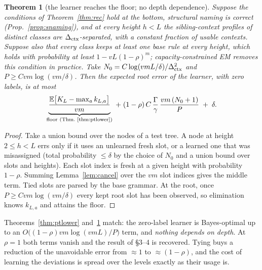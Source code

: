 \documentclass[11pt]{article}
\newtheorem{theorem}{Theorem}
\theoremstyle{definition}
\newcommand{\E}{\mathbb{E}}
\begin{document}
\begin{theorem}[the learner reaches the floor; no depth dependence]\label{thm:ptupper}
Suppose the conditions of Theorem~\ref{thm:rec} hold at the bottom, structural naming is correct
(Prop.~\ref{prop:snaming}), and at every height $h<L$ the sibling-context profiles of distinct
classes are $\Delta_{\rm ctx}$-separated, with a constant fraction of usable contexts. Suppose
also that every class keeps at least one base rule at every height, which holds with probability
at least $1-vL(1-\rho)^m$; capacity-constrained EM removes this condition in practice. Take
$N_0=C\log(vmL/\delta)/\Delta_{\rm ctx}^2$ and $P\ge Cvm\log(vm/\delta)$. Then the expected root
error of the learner, with zero labels, is at most
\[
\underbrace{\frac{\E\big[K_L-\max_ak_{L,a}\big]}{vm}}_{\text{floor (Thm.~\ref{thm:ptlower})}}
\;+\;(1-\rho)\,C\,\frac{\Gamma}{\gamma}\,\frac{vm\,(N_0+1)}{P}\;+\;\delta .
\]
\end{theorem}
\begin{proof}
Take a union bound over the nodes of a test tree. A node at height $2\le h<L$ errs only if it
uses an unlearned fresh slot, or a learned one that was misassigned (total probability $\le\delta$
by the choice of $N_0$ and a union bound over slots and heights). Each slot index is fresh at a
given height with probability $1-\rho$. Summing Lemma~\ref{lem:cancel} over the $vm$ slot
indices gives the middle term. Tied slots are parsed by the base grammar. At the root, once
$P\ge Cvm\log(vm/\delta)$ every kept root slot has been observed, so elimination knows
$k_{L,a}$ and attains the floor.
\end{proof}
\noindent Theorems~\ref{thm:ptlower} and~\ref{thm:ptupper} match: the zero-label learner is
Bayes-optimal up to an $O\big((1-\rho)vm\log(vmL)/P\big)$ term, and \emph{nothing depends on
depth}. At $\rho=1$ both terms vanish and the result of \S3--4 is recovered. Tying buys a
reduction of the unavoidable error from $\approx1$ to $\approx(1-\rho)$, and the cost of
learning the deviations is spread over the levels exactly as their usage is.
\end{document}
